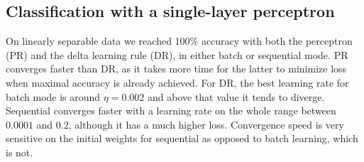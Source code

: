 \documentclass[a4paper]{article}
\begin{document}
\subsection{Classification with a single-layer perceptron} \label{section_slp} %
%
On linearly separable data we reached 100\% accuracy with both the perceptron (PR) and the delta learning rule (DR), in either batch or sequential mode. PR converges faster than DR, as it takes more time for the latter to minimize loss when maximal accuracy is already achieved.
%
%
%
For DR, the best learning rate for batch mode is around $\eta = 0.002$ and above that value it tends to diverge. Sequential converges faster with a learning rate on the whole range between $0.0001$ and $0.2$, although it has a much higher loss.
%
Convergence speed is very sensitive on the initial weights for sequential as opposed to batch learning, which is not. %
%
\begin{table}[H]
	\centering
	\caption{Perceptron learning rule}
	\label{tab:pcn}
\end{table}
\end{document}

